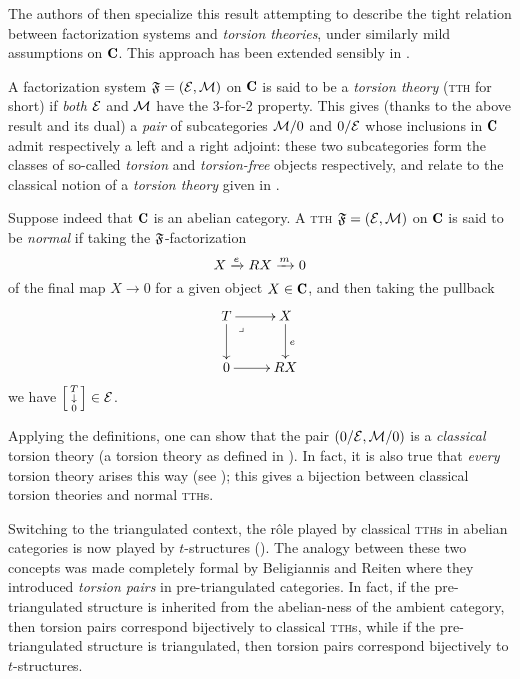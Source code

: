 The authors of \cite{CHK} then specialize this result attempting to describe the tight relation between factorization systems and \emph{torsion theories}, under similarly mild assumptions on $\C$. This approach has been extended sensibly in \cite{rosicky2007factorization}.

A factorization system $\mathfrak{F}=(\mathcal{E},\mathcal{M})$ on $\C$ is said to be a \emph{torsion theory} (\textsc{tth} for short) if \emph{both} $\mathcal{E}$ and $\mathcal{M}$ have the 3-for-2 property. This gives (thanks to the above result and its dual) a \emph{pair} of subcategories $\mathcal{M}/0$ and $0/\mathcal{E}$ whose inclusions in $\C$ admit respectively a left and a right adjoint: these two subcategories form the classes of so\hyp{}called \emph{torsion} and \emph{torsion\hyp{}free} objects respectively, and relate to the classical notion of a \emph{torsion theory} given in \cite{dickson1966torsion}.

Suppose indeed that $\C$ is an abelian category. A \textsc{tth} $\mathfrak{F}=(\mathcal{E},\mathcal{M})$ on $\C$ is said to be \emph{normal} if taking the $\mathfrak{F}$-factorization
\[
X\xrightarrow{e}RX\xrightarrow{m}0
\]
of the final map $X\to 0$ for a given object $X\in \C$, and then taking the pullback
\begin{equation}\label{pb_diagram}
\begin{matrix}\xymatrix{
T\ar[r]\ar[d]\ar@{}[dr]|(.25)\lrcorner&X\ar[d]^{e}\\
0\ar[r]& RX
}\end{matrix}
\end{equation}
we have $\left[ \begin{smallmatrix} T \\ \downarrow \\ 0 \end{smallmatrix}\right]\in \mathcal{E}$.

Applying the definitions, one can show that the pair $(0/\mathcal{E},\mathcal{M}/0)$ is a \emph{classical} torsion theory (\ie a torsion theory as defined in \cite{dickson1966torsion}). In fact, it is also true that \emph{every} torsion theory arises this way (see \cite{rosicky2007factorization}); this gives a bijection between classical torsion theories and normal \textsc{tth}s.

Switching to the triangulated context, the r\^ole played by classical \textsc{tth}s in abelian categories is now played by $t$-structures (\cite{BBD,keller2007derived}). The analogy between these two concepts was made completely formal by Beligiannis and Reiten \cite{beligiannis-reiten} where they introduced \emph{torsion pairs} in pre-triangulated categories. In fact, if the pre-triangulated structure is inherited from the abelian-ness of the ambient category, then torsion pairs correspond bijectively to classical \textsc{tth}s, while if the pre-triangulated structure is triangulated, then torsion pairs correspond bijectively to $t$-structures.

